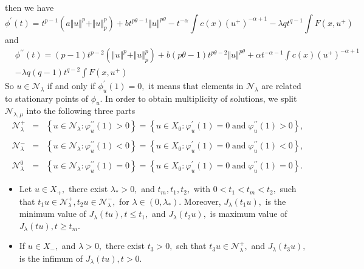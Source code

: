 \documentclass[10pt,twoside,reqno,centertags,draft]{amsart}
\begin{document}
then we have
\begin{equation}\label{ph1}
\phi^{\prime}(t) = t^{p-1}\left( a \Vert u \Vert^p + \Vert u \Vert_{p}^{p}\right) + b t^{p \theta - 1}\Vert u \Vert^{p \theta}  -t^{-\alpha} \int c(x)(u^+)^{-\alpha+1} - \lambda q t^{q-1} \int F(x,u^+) 
\end{equation}
and 
\begin{equation}\label{ph2}
\begin{aligned}
& \phi^{\prime \prime}(t) = (p-1)t^{p-2} \left(\Vert u \Vert^p + \Vert u \Vert_{p}^{p}\right) + b(p \theta - 1) t^{p \theta - 2}\Vert u \Vert^{p \theta} + \alpha t^{-\alpha -1} \int c(x)(u^+)^{-\alpha+1} \\
&- \lambda q (q-1) t^{q-2} \int F(x,u^+) 
\end{aligned}
\end{equation}
So $ u \in \mathcal{N}_{\lambda} $ if and only if $ \phi^{\prime}_{u}(1)=0,$ it means that elements in $ \mathcal{N}_{\lambda} $ are related to stationary 
points of $ \phi_{u}.$ In order to obtain multiplicity of solutions, we split $\mathcal{N}_{\lambda ,\mu }$  into the following three parts 
\begin{eqnarray*}
\mathcal{N}_{\lambda}^{+} &=&\left\{ u\in \mathcal{N}_{\lambda}:\varphi _{u}^{\prime \prime }(1)>0\right\} =\left\{ u\in X_0:\varphi _{u}^{\prime}(1)=0 \;\mbox{and}\;\varphi _{u}^{\prime \prime }(1)>0\right\}, \\
&& \\
\mathcal{N}_{\lambda}^{-} &=&\left\{ u\in \mathcal{N}_{\lambda }:\varphi _{u}^{\prime \prime }(1)<0\right\}=\left\{ u\in X_0:\varphi _{u}^{\prime}(1)=0 \;\mbox{and}\;\varphi _{u}^{\prime \prime }(1)<0\right\} , \\
&& \\
\mathcal{N}_{\lambda}^{0} &=&\left\{ u\in \mathcal{N}_{\lambda}:\varphi _{u}^{\prime \prime }(1)=0\right\}=\left\{ u\in X_0:\varphi _{u}^{\prime}(1)=0 \;\mbox{and}\;\varphi _{u}^{\prime \prime }(1)=0\right\} .
\end{eqnarray*}
\begin{lemma}\label{l1}
\begin{itemize}
\item Let $ u \in X_+,$ there exist $ \lambda_* > 0,$ and $ t_m, t_1, t_2,$ with $ 0 < t_1 < t_m < t_2,$ such that $ t_1u \in \mathcal{N}_{\lambda}^{+}, t_2u \in \mathcal{N}_{\lambda}^{-},$ for $ \lambda \in (0, \lambda_*).$ Moreover, $ J_{\lambda}(t_1u),$ is the minimum value of $ J_{\lambda}(tu), t \leq t_1,$ and 
$ J_{\lambda}(t_2u),$ is maximum value of  $ J_{\lambda}(tu), t \geq t_m.$
\item If $ u \in X_-,$ and $ \lambda > 0,$ there exist  $ t_3 > 0,$ sch that $ t_3u \in \mathcal{N}_{\lambda}^{+},$ and $ J_{\lambda}(t_3u),$ is the infimum
of $ J_{\lambda}(tu), t > 0.$
\end{itemize} 
\end{lemma}
\end{document}
